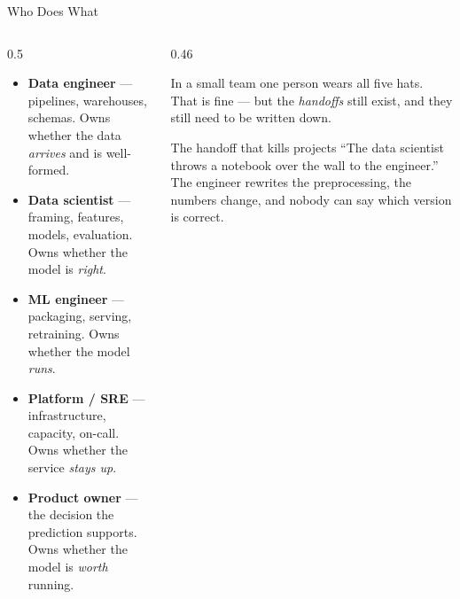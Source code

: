 \begin{frame}{Who Does What}

    \begin{columns}[T]
        \begin{column}{0.5\textwidth}
            \small
            \begin{itemize}
                \setlength\itemsep{0.45em}
                \item \textbf{Data engineer} --- pipelines, warehouses, schemas. Owns whether the data
                      \emph{arrives} and is well-formed.
                \item \textbf{Data scientist} --- framing, features, models, evaluation. Owns whether the
                      model is \emph{right}.
                \item \textbf{ML engineer} --- packaging, serving, retraining. Owns whether the model
                      \emph{runs}.
                \item \textbf{Platform / SRE} --- infrastructure, capacity, on-call. Owns whether the service
                      \emph{stays up}.
                \item \textbf{Product owner} --- the decision the prediction supports. Owns whether the model
                      is \emph{worth} running.
            \end{itemize}
        \end{column}
        \begin{column}{0.46\textwidth}
            \begin{tcolorbox}[colback=yellow!8, colframe=yellow!50!black, boxrule=0.5pt]
                \small In a small team one person wears all five hats. That is fine --- but the
                \emph{handoffs} still exist, and they still need to be written down.
            \end{tcolorbox}
            \vspace{0.6em}
            \begin{alertblock}{The handoff that kills projects}
                \small ``The data scientist throws a notebook over the wall to the engineer.'' The engineer
                rewrites the preprocessing, the numbers change, and nobody can say which version is correct.
            \end{alertblock}
        \end{column}
    \end{columns}

\end{frame}

